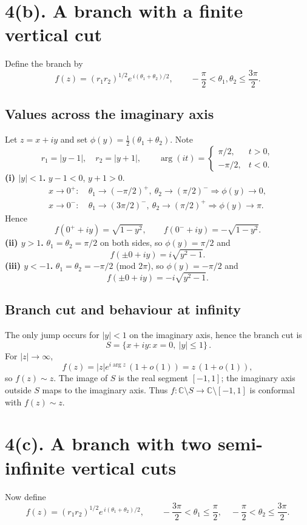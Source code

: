 \documentclass[11pt]{article}
\begin{document}
	\section*{4(b). A branch with a finite vertical cut}
	Define the branch by
	\[
	f(z)=(r_1r_2)^{1/2}e^{\,i(\theta_1+\theta_2)/2},\qquad -\frac{\pi}{2}<\theta_1,\theta_2\le\frac{3\pi}{2}.
	\]
	
	\subsection*{Values across the imaginary axis}
	Let \(z=x+iy\) and set \(\phi(y)=\tfrac12(\theta_1+\theta_2)\).
	Note
	\[
	r_1=|y-1|,\quad r_2=|y+1|,\qquad
	\arg(i t)=\begin{cases}\pi/2,&t>0,\\ -\pi/2,&t<0.\end{cases}
	\]
	\textbf{(i) \(|y|<1\).} \(y-1<0\), \(y+1>0\).
	\begin{align*}
		x\to 0^+:&\ \theta_1\to(-\pi/2)^+,\ \theta_2\to(\pi/2)^- \Rightarrow \phi(y)\to 0,\\
		x\to 0^-:&\ \theta_1\to(3\pi/2)^-,\ \theta_2\to(\pi/2)^+ \Rightarrow \phi(y)\to \pi.
	\end{align*}
	Hence
	\[
	f(0^+{+}iy)=\sqrt{1-y^2},\qquad f(0^-{+}iy)=-\sqrt{1-y^2}.
	\]
	\textbf{(ii) \(y>1\).} \(\theta_1=\theta_2=\pi/2\) on both sides, so \(\phi(y)=\pi/2\) and
	\[
	f(\pm0{+}iy)= i\sqrt{y^2-1}.
	\]
	\textbf{(iii) \(y<-1\).} \(\theta_1=\theta_2=-\pi/2\) (mod \(2\pi\)), so \(\phi(y)=-\pi/2\) and
	\[
	f(\pm0{+}iy)= -i\sqrt{y^2-1}.
	\]
	
	\subsection*{Branch cut and behaviour at infinity}
	The only jump occurs for \(|y|<1\) on the imaginary axis, hence the branch cut is
	\[
	\boxed{\,S=\{x+iy : x=0,\ |y|\le 1\}\, }.
	\]
	For \(|z|\to\infty\),
	\[
	f(z)=|z|e^{i\arg z}\,(1+o(1))=z\,(1+o(1)),
	\]
	so \(f(z)\sim z\). The image of \(S\) is the real segment \([-1,1]\); the imaginary axis outside \(S\) maps to the
	imaginary axis. Thus \(f:\mathbb C\setminus S\to \mathbb C\setminus[-1,1]\) is conformal with \(f(z)\sim z\).
	
	\section*{4(c). A branch with two semi-infinite vertical cuts}
	Now define
	\[
	f(z)=(r_1r_2)^{1/2}e^{\,i(\theta_1+\theta_2)/2},\qquad
	-\frac{3\pi}{2}<\theta_1\le\frac{\pi}{2},\quad -\frac{\pi}{2}<\theta_2\le\frac{3\pi}{2}.
	\]
	
\end{document}
